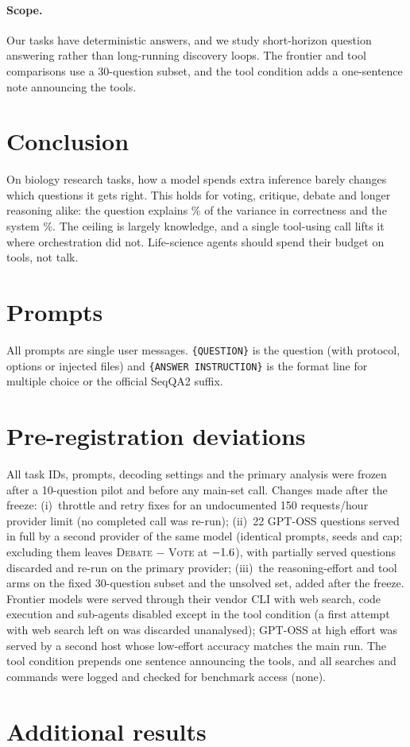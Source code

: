 \documentclass{article}
\newcommand{\vote}{\textsc{Vote}}
\newcommand{\debate}{\textsc{Debate}}
\begin{document}
\paragraph{Scope.}
Our tasks have deterministic answers, and we study short-horizon question answering rather than long-running discovery loops. The frontier and tool comparisons use a 30-question subset, and the tool condition adds a one-sentence note announcing the tools.

\section{Conclusion}
On biology research tasks, how a model spends extra inference barely changes which questions it gets right. This holds for voting, critique, debate and longer reasoning alike: the question explains \ItemShareMain\% of the variance in correctness and the system \ArmShareMain\%.
The ceiling is largely knowledge, and a single tool-using call lifts it where orchestration did not.
Life-science agents should spend their budget on tools, not talk.




\appendix
\section{Prompts}\label{app:prompts}
All prompts are single user messages. \texttt{\{QUESTION\}} is the question (with protocol, options or injected files) and \texttt{\{ANSWER INSTRUCTION\}} is the format line for multiple choice or the official SeqQA2 suffix.
\label{fig:strategies}


\section{Pre-registration deviations}\label{app:deviations}
All task IDs, prompts, decoding settings and the primary analysis were frozen after a 10-question pilot and before any main-set call. Changes made after the freeze:
(i)~throttle and retry fixes for an undocumented 150 requests/hour provider limit (no completed call was re-run);
(ii)~22 GPT-OSS questions served in full by a second provider of the same model (identical prompts, seeds and cap; excluding them leaves \debate{} $-$ \vote{} at $-1.6$), with partially served questions discarded and re-run on the primary provider;
(iii)~the reasoning-effort and tool arms on the fixed 30-question subset and the unsolved set, added after the freeze. Frontier models were served through their vendor CLI with web search, code execution and sub-agents disabled except in the tool condition (a first attempt with web search left on was discarded unanalysed); GPT-OSS at high effort was served by a second host whose low-effort accuracy matches the main run. The tool condition prepends one sentence announcing the tools, and all searches and commands were logged and checked for benchmark access (none).

\section{Additional results}

\end{document}

